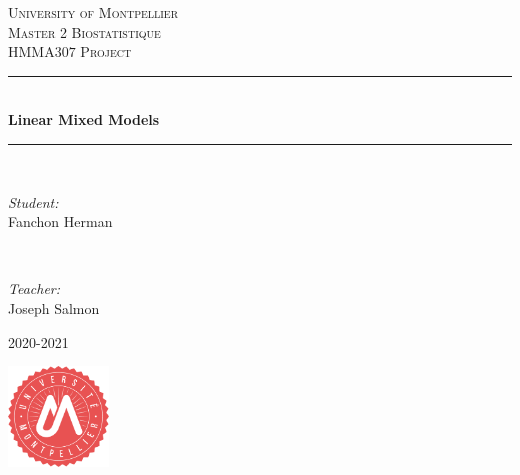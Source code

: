 \documentclass{article}
\author{Fanchon Herman}
\begin{document}
\begin{titlepage} 
	\newcommand{\HRule}{\rule{\linewidth}{0.5mm}}
	
	\center
	
	\textsc{\LARGE University of Montpellier}\\[1.5cm]
	
	\textsc{\Large Master 2 Biostatistique }\\[0.5cm] 
	
	\textsc{\large HMMA$307$ Project}\\[0.5cm] 

	\HRule\\[0.4cm]
	
	{\huge\bfseries Linear Mixed Models}\\[0.4cm] 
	
	\HRule\\[1.5cm]
	
	\begin{minipage}{0.4\textwidth}
		\begin{flushleft}
			\large
			\textit{Student: }\\
			Fanchon Herman
		\end{flushleft}
	\end{minipage}
	~
	\begin{minipage}{0.4\textwidth}
		\begin{flushright}
			\large
			\textit{Teacher: }\\
			Joseph Salmon\\
		\end{flushright}
	\end{minipage}
		\vfill 
	
	{\large 2020-2021} 

		\vfill\vfill
		
\centering
\includegraphics[width=0.2\textwidth]{./images/Logo}


	
	 
	
	\vfill 
\end{titlepage}

\tableofcontents
\newpage
\end{document}
